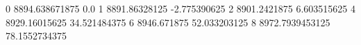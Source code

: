 0 8894.638671875 0.0
1 8891.86328125 -2.775390625
2 8901.2421875 6.603515625
4 8929.16015625 34.521484375
6 8946.671875 52.033203125
8 8972.7939453125 78.1552734375
